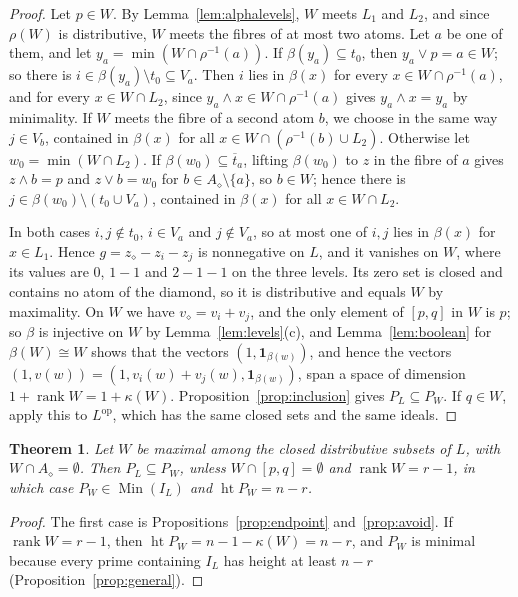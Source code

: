 \documentclass{amsart}
\newtheorem{theorem}{Theorem}[section]
\theoremstyle{definition}
\DeclareMathOperator{\rk}{rank}
\DeclareMathOperator{\htop}{ht}
\DeclareMathOperator{\Min}{Min}
\newcommand{\one}{\mathbf 1}
\newcommand{\dm}{\diamond}
\newcommand{\ut}{\overline{t}}
\begin{document}
\begin{proof}
Let $p\in W$. By Lemma~\ref{lem:alphalevels}, $W$ meets $L_1$ and $L_2$, and since $\rho(W)$ is distributive, $W$ meets the fibres of at most two atoms. Let $a$ be one of them, and let $y_a=\min(W\cap\rho^{-1}(a))$. If $\beta(y_a)\subseteq t_0$, then $y_a\vee p=a\in W$; so there is $i\in\beta(y_a)\setminus t_0\subseteq V_a$. Then $i$ lies in $\beta(x)$ for every $x\in W\cap\rho^{-1}(a)$, and for every $x\in W\cap L_2$, since $y_a\wedge x\in W\cap\rho^{-1}(a)$ gives $y_a\wedge x=y_a$ by minimality. If $W$ meets the fibre of a second atom $b$, we choose in the same way $j\in V_b$, contained in $\beta(x)$ for all $x\in W\cap(\rho^{-1}(b)\cup L_2)$. Otherwise let $w_0=\min(W\cap L_2)$. If $\beta(w_0)\subseteq\ut_a$, lifting $\beta(w_0)$ to $z$ in the fibre of $a$ gives $z\wedge b=p$ and $z\vee b=w_0$ for $b\in A_\dm\setminus\{a\}$, so $b\in W$; hence there is $j\in\beta(w_0)\setminus(t_0\cup V_a)$, contained in $\beta(x)$ for all $x\in W\cap L_2$.

In both cases $i,j\notin t_0$, $i\in V_a$ and $j\notin V_a$, so at most one of $i,j$ lies in $\beta(x)$ for $x\in L_1$. Hence $g=z_\dm-z_i-z_j$ is nonnegative on $L$, and it vanishes on $W$, where its values are $0$, $1-1$ and $2-1-1$ on the three levels. Its zero set is closed and contains no atom of the diamond, so it is distributive and equals $W$ by maximality. On $W$ we have $v_\dm=v_i+v_j$, and the only element of $[p,q]$ in $W$ is $p$; so $\beta$ is injective on $W$ by Lemma~\ref{lem:levels}(c), and Lemma~\ref{lem:boolean} for $\beta(W)\cong W$ shows that the vectors $(1,\one_{\beta(w)})$, and hence the vectors $(1,v(w))=(1,v_i(w)+v_j(w),\one_{\beta(w)})$, span a space of dimension $1+\rk W=1+\kappa(W)$. Proposition~\ref{prop:inclusion} gives $P_L\subseteq P_W$. If $q\in W$, apply this to $L^{\mathrm{op}}$, which has the same closed sets and the same ideals.
\end{proof}

\begin{theorem}\label{thm:atomfree}
Let $W$ be maximal among the closed distributive subsets of $L$, with $W\cap A_\dm=\emptyset$. Then $P_L\subseteq P_W$, unless $W\cap[p,q]=\emptyset$ and $\rk W=r-1$, in which case $P_W\in\Min(I_L)$ and $\htop P_W=n-r$.
\end{theorem}

\begin{proof}
The first case is Propositions~\ref{prop:endpoint} and~\ref{prop:avoid}. If $\rk W=r-1$, then $\htop P_W=n-1-\kappa(W)=n-r$, and $P_W$ is minimal because every prime containing $I_L$ has height at least $n-r$ (Proposition~\ref{prop:general}).
\end{proof}
\end{document}
